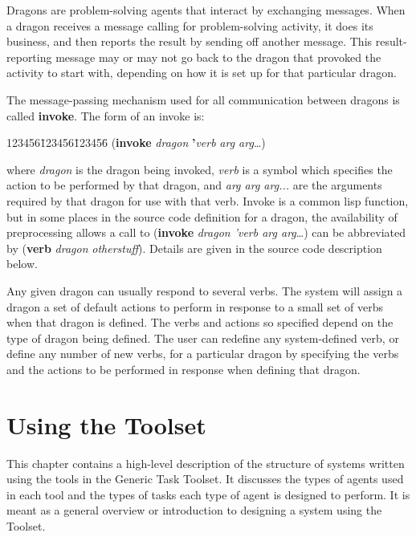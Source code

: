 Dragons are problem-solving agents that interact by exchanging
messages.  When a dragon receives a message calling for
problem-solving activity, it does its business, and then reports the
result by sending off another message.  This result-reporting message
may or may not go back to the dragon that provoked the activity to
start with, depending on how it is set up for that particular dragon.

The message-passing mechanism used for all communication between dragons
is called {\bf invoke}. The form of an invoke is:

\begin{tabbing}
123456\=123456\=123456\= \kill
\>({\bf invoke} {\it dragon\/} {\bf '}{\it verb\/} {\it arg arg}\ldots)  \\
\end{tabbing}
where {\it dragon} is the dragon being invoked, {\it verb} is a symbol
which specifies the action to be performed by that dragon, and {\it
arg arg arg...} are the arguments required by that dragon for use with
that verb. Invoke is a common lisp function, but in some places in the
source code definition for a dragon, the availability of preprocessing
allows a call to ({\bf invoke} {\it dragon\/ 'verb\/ arg arg}\ldots)
can be abbreviated by ({\bf verb} {\it dragon\/} {\it otherstuff}).
Details are given in the source code description below.

Any given dragon can usually respond to several verbs. The system will
assign a dragon a set of default actions to perform in response to a
small set of verbs when that dragon is defined. The verbs and actions
so specified depend on the type of dragon being defined. The user can
redefine any system-defined verb, or define any number of new verbs,
for a particular dragon by specifying the verbs and the actions to be
performed in response when defining that dragon.




\chapter{Using the Toolset}

This chapter contains a high-level description of the structure of
systems written using the tools in the Generic Task Toolset. It
discusses the types of agents used in each tool and the types of tasks
each type of agent is designed to perform. It is meant as a general
overview or introduction to designing a system using the Toolset.


